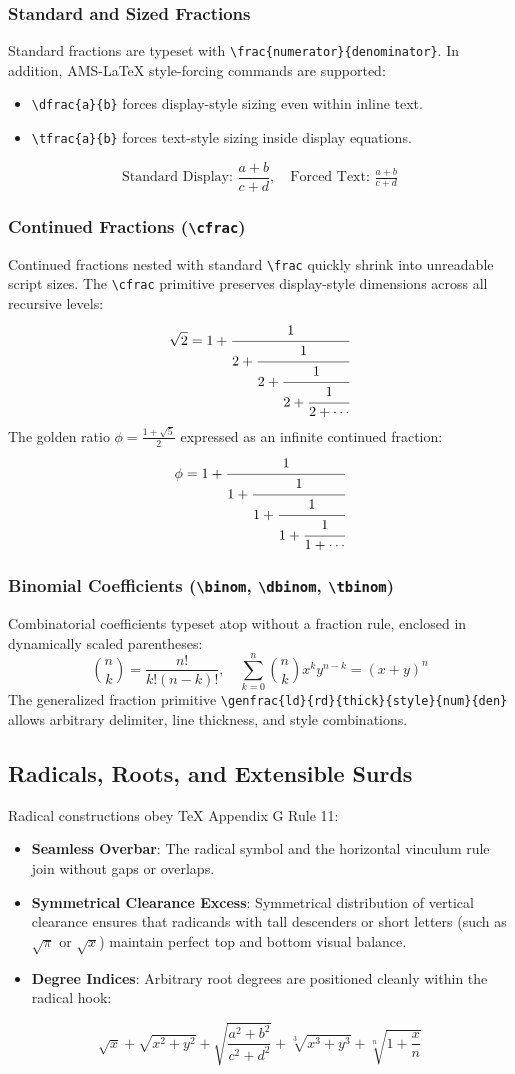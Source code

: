 \documentclass[11pt, a4paper]{article}
\begin{document}
\subsubsection{Standard and Sized Fractions}
Standard fractions are typeset with \verb|\frac{numerator}{denominator}|. In addition, AMS-LaTeX style-forcing commands are supported:
\begin{itemize}
\item \verb|\dfrac{a}{b}| forces display-style sizing even within inline text.
\item \verb|\tfrac{a}{b}| forces text-style sizing inside display equations.
\end{itemize}
\[
\text{Standard Display: } \frac{a + b}{c + d}, \quad \text{Forced Text: } \tfrac{a + b}{c + d}
\]

\subsubsection{Continued Fractions (\texttt{\textbackslash cfrac})}
Continued fractions nested with standard \verb|\frac| quickly shrink into unreadable script sizes. The \verb|\cfrac| primitive preserves display-style dimensions across all recursive levels:
\[
\sqrt{2} = 1 + \cfrac{1}{2 + \cfrac{1}{2 + \cfrac{1}{2 + \cfrac{1}{2 + \dotsb}}}}
\]
The golden ratio $\phi = \frac{1 + \sqrt{5}}{2}$ expressed as an infinite continued fraction:
\[
\phi = 1 + \cfrac{1}{1 + \cfrac{1}{1 + \cfrac{1}{1 + \cfrac{1}{1 + \dotsb}}}}
\]

\subsubsection{Binomial Coefficients (\texttt{\textbackslash binom}, \texttt{\textbackslash dbinom}, \texttt{\textbackslash tbinom})}
Combinatorial coefficients typeset atop without a fraction rule, enclosed in dynamically scaled parentheses:
\[
\binom{n}{k} = \frac{n!}{k!(n-k)!}, \quad \sum_{k=0}^n \binom{n}{k} x^k y^{n-k} = (x + y)^n
\]
The generalized fraction primitive \verb|\genfrac{ld}{rd}{thick}{style}{num}{den}| allows arbitrary delimiter, line thickness, and style combinations.

\subsection{Radicals, Roots, and Extensible Surds}
Radical constructions obey TeX Appendix G Rule 11:
\begin{itemize}
\item \textbf{Seamless Overbar}: The radical symbol and the horizontal vinculum rule join without gaps or overlaps.
\item \textbf{Symmetrical Clearance Excess}: Symmetrical distribution of vertical clearance ensures that radicands with tall descenders or short letters (such as $\sqrt{\pi}$ or $\sqrt{x}$) maintain perfect top and bottom visual balance.
\item \textbf{Degree Indices}: Arbitrary root degrees are positioned cleanly within the radical hook:
\end{itemize}
\[
\sqrt{x} + \sqrt{x^2 + y^2} + \sqrt{\frac{a^2 + b^2}{c^2 + d^2}} + \sqrt[3]{x^3 + y^3} + \sqrt[n]{1 + \frac{x}{n}}
\]
\end{document}
